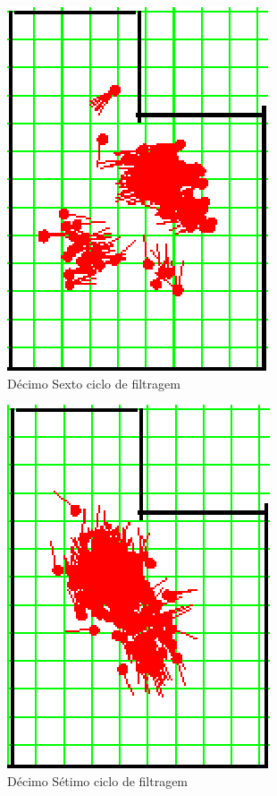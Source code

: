 \begin{figure}[H]
  \centering
  \includegraphics[scale=1]{figuras/cen1_ex3/17.eps}
  \caption[Décimo Sexto Ciclo de Filtragem]{Décimo Sexto ciclo de filtragem}
  \label{img:cen1_ex3_17}
\end{figure}

\begin{figure}[H]
  \centering
  \includegraphics[scale=1]{figuras/cen1_ex3/18.eps}
  \caption[Décimo Sétimo Ciclo de Filtragem]{Décimo Sétimo ciclo de filtragem}
  \label{img:cen1_ex3_18}
\end{figure}

